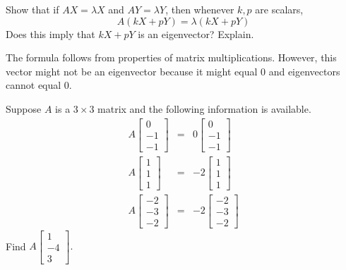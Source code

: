 \documentclass{ximera}
\begin{document}
\begin{problem}\label{prb:8.5} Show that if $AX=\lambda X$ and $AY=\lambda Y$, then whenever $k,p$ are scalars,
\begin{equation*}
A\left( kX+pY\right) =\lambda \left( kX+pY\right)
\end{equation*}
Does this imply that $kX+pY$ is an eigenvector? Explain.
\vspace{1mm}
\begin{hint}
The formula follows from properties of matrix multiplications. However,
this vector might not be an eigenvector because it might equal $0$
and eigenvectors cannot equal $0$.
\end{hint}
\end{problem}

\begin{problem}\label{prb:8.6} Suppose $A$ is a $3\times 3$ matrix and the following information is
available.
\begin{eqnarray*}
A\left[
\begin{array}{r}
0 \\
-1 \\
-1
\end{array}
\right] &=&0\left[
\begin{array}{r}
0 \\
-1 \\
-1
\end{array}
\right] \\
A\left[
\begin{array}{r}
1 \\
1 \\
1
\end{array}
\right] &=&-2\left[
\begin{array}{r}
1 \\
1 \\
1
\end{array}
\right] \\
A\left[
\begin{array}{r}
-2 \\
-3 \\
-2
\end{array}
\right] &=&-2\left[
\begin{array}{r}
-2 \\
-3 \\
-2
\end{array}
\right]
\end{eqnarray*}
Find $A\left[
\begin{array}{r}
1 \\
-4 \\
3
\end{array}
\right]. $
\end{problem}
\end{document}
